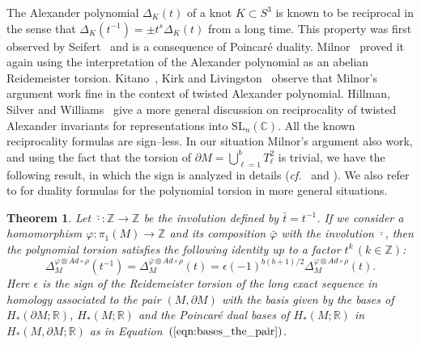 \documentclass[a4paper]{amsart}
\theoremstyle{plain}
\newtheorem{theorem}{Theorem}
\theoremstyle{definition}
\theoremstyle{remark}
\newcommand{\cf}{\emph{cf.}\:}
\newcommand{\ZZ}{{\mathbb Z}}
\newcommand{\CC}{{\mathbb C}}
\newcommand{\IR}{{\mathbb R}}
\newcommand{\PolyTors}[2]{\Delta_{#1}^{#2}}
\newcommand{\otAd}[2]{#1 \otimes Ad \circ #2}
\newcommand{\bord}{\partial}
\begin{document}
The Alexander polynomial $\Delta_K(t)$ of a knot $K \subset S^3$ is
known to be reciprocal in the sense that $\Delta_K(t^{-1}) = \pm t^s
\Delta_K(t)$ from a long time. This property was first observed by
Seifert~\cite{Seifert:1934} and is a consequence of
Poincar\'e duality. Milnor~\cite{Milnor:1962} proved
it again using the interpretation of the Alexander polynomial as an
abelian Reidemeister torsion. Kitano~\cite{Kitano}, Kirk and
Livingston~\cite{KL} observe that Milnor's argument work fine in the
context of twisted Alexander polynomial. Hillman, Silver and
Williams~\cite{HSW:09} give a more general discussion on reciprocality
of twisted Alexander invariants for representations into
$\mathrm{SL}_n(\CC)$. All the known reciprocality formulas are
sign--less. In our situation Milnor's argument also work, and using
the fact that the torsion of $\partial M = \bigcup_{\ell = 1}^b
T_\ell^2$ is trivial, we have the following result, in which the sign
is analyzed in details (\cf~\cite[Theorem 2]{Milnor:1962} and
\cite[Theorem 5.1]{KL}).
We also refer to \cite{FriedlKimKitayama_Poincare}
for duality formulas for the polynomial torsion in more general situations.


\begin{theorem}\label{theorem:symmetry_torsion}
  Let $\bar{\cdot} \colon \ZZ \to \ZZ$ be the involution defined by
  $\bar{t} = t^{-1}$.  If we consider a homomorphism 
  $\varphi \colon \pi_1(M) \to \ZZ$ and its composition $\bar{\varphi}$ 
  with the involution $\bar{\cdot}$, 
  then the polynomial torsion satisfies the following identity 
  up to a factor $t^k\, (k \in \ZZ)$:
  \[
  \PolyTors{M}{\otAd{\varphi}{\rho}}(t^{-1}) = 
  \PolyTors{M}{\otAd{\bar{\varphi}}{\rho}}(t) = 
  \epsilon (-1)^{b(b+1)/2} \PolyTors{M}{\otAd{\varphi}{\rho}}(t).
  \]
  Here $\epsilon$ is the sign of the Reidemeister torsion of the long
  exact sequence in homology associated to the pair $(M, \bord M)$
  with the basis given by the bases of $H_*(\bord M;\IR)$, $H_*(M;\IR)$
  and the Poincar\'e dual bases of $H_*(M;\IR)$ in $H_*(M, \bord
  M;\IR)$ as in Equation~$(\ref{eqn:bases_the_pair})$.
\end{theorem}
\end{document}

